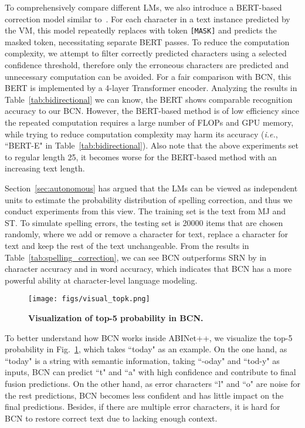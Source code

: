 \documentclass[10pt,journal,compsoc]{IEEEtran}
\def\ie{{\it i.e.}\xspace}
\begin{document}
To comprehensively compare different LMs, we also introduce a BERT-based correction model similar to~\cite{bhunia2021joint}. For each character  in a text instance  predicted by the VM, this model repeatedly replaces  with token {\tt{[MASK]}} and predicts the masked token, necessitating  separate BERT passes. To reduce the computation complexity, we attempt to filter correctly predicted characters using a selected confidence threshold, therefore only the erroneous characters are predicted and unnecessary computation can be avoided. For a fair comparison with BCN, this BERT is implemented by a 4-layer Transformer encoder. Analyzing the results in Table~\ref{tab:bidirectional} we can know, the BERT shows comparable recognition accuracy to our BCN. However, the BERT-based method is of low efficiency since the repeated computation requires a large number of FLOPs and GPU memory, while trying to reduce computation complexity may harm its accuracy (\ie, “BERT-E" in Table~\ref{tab:bidirectional}). Also note that the above experiments set  to regular length 25, it becomes worse for the BERT-based method with an increasing text length.


Section~\ref{sec:autonomous} has argued that the LMs can be viewed as independent units to estimate the probability distribution of spelling correction, and thus we conduct experiments from this view. The training set is the text from MJ and ST. To simulate spelling errors, the testing set is 20000 items that are chosen randomly, where we add or remove a character for  text, replace a character for  text and keep the rest of the text unchangeable. From the results in Table~\ref{tab:spelling_correction}, we can see BCN outperforms SRN by  in character accuracy and  in word accuracy, which indicates that BCN has a more powerful ability at character-level language modeling.

\begin{figure}
   \begin{center}
      \texttt{[image: figs/visual\_topk.png]}
      \caption{\textbf{Visualization of top-5 probability in BCN.}}
      \label{fig:visual_topk}
   \end{center}
   \vspace{0em}   
\end{figure}

To better understand how BCN works inside ABINet++, we visualize the top-5 probability in Fig.~\ref{fig:visual_topk}, which takes “today" as an example. On the one hand, as ``today" is a string with semantic information, taking ``-oday" and ``tod-y" as inputs, BCN can predict ``t" and ``a" with high confidence and contribute to final fusion predictions. On the other hand, as error characters ``l" and ``o" are noise for the rest predictions, BCN becomes less confident and has little impact on the final predictions. Besides, if there are multiple error characters, it is hard for BCN to restore correct text due to lacking enough context.
\end{document}

